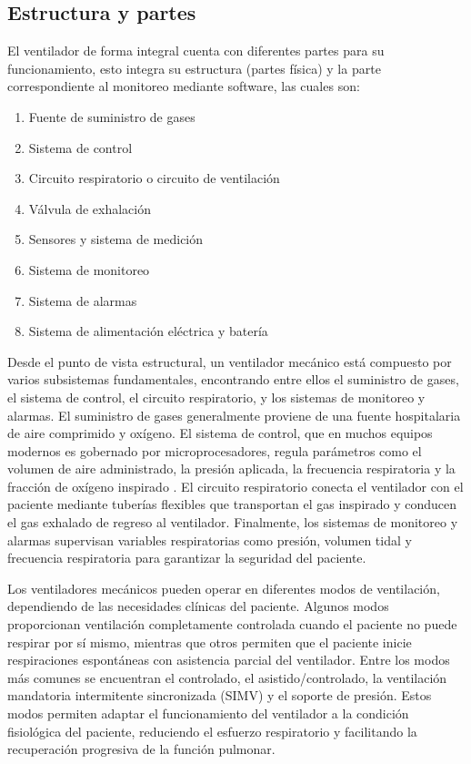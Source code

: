 \documentclass[a4paper,openany,12pt]{book}
\begin{document}
\subsection{Estructura y partes}

El ventilador de forma integral cuenta con diferentes partes para su funcionamiento, esto integra su estructura (partes física) y la parte correspondiente al monitoreo mediante software, las cuales son:

\begin{enumerate}
    \item Fuente de suministro de gases
    \item Sistema de control
    \item Circuito respiratorio o circuito de ventilación
    \item Válvula de exhalación
    \item Sensores y sistema de medición
    \item Sistema de monitoreo
    \item Sistema de alarmas
    \item Sistema de alimentación eléctrica y batería
\end{enumerate}

Desde el punto de vista estructural, un ventilador mecánico está compuesto por varios subsistemas fundamentales, encontrando entre ellos el suministro de gases, el sistema de control, el circuito respiratorio, y los sistemas de monitoreo y alarmas. El suministro de gases generalmente proviene de una fuente hospitalaria de aire comprimido y oxígeno. El sistema de control, que en muchos equipos modernos es gobernado por microprocesadores, regula parámetros como el volumen de aire administrado, la presión aplicada, la frecuencia respiratoria y la fracción de oxígeno inspirado . El circuito respiratorio conecta el ventilador con el paciente mediante tuberías flexibles que transportan el gas inspirado y conducen el gas exhalado de regreso al ventilador. Finalmente, los sistemas de monitoreo y alarmas supervisan variables respiratorias como presión, volumen tidal y frecuencia respiratoria para garantizar la seguridad del paciente. 

Los ventiladores mecánicos pueden operar en diferentes modos de ventilación, dependiendo de las necesidades clínicas del paciente. Algunos modos proporcionan ventilación completamente controlada cuando el paciente no puede respirar por sí mismo, mientras que otros permiten que el paciente inicie respiraciones espontáneas con asistencia parcial del ventilador. Entre los modos más comunes se encuentran el controlado, el asistido/controlado, la ventilación mandatoria intermitente sincronizada (SIMV) y el soporte de presión. Estos modos permiten adaptar el funcionamiento del ventilador a la condición fisiológica del paciente, reduciendo el esfuerzo respiratorio y facilitando la recuperación progresiva de la función pulmonar.
\end{document}
